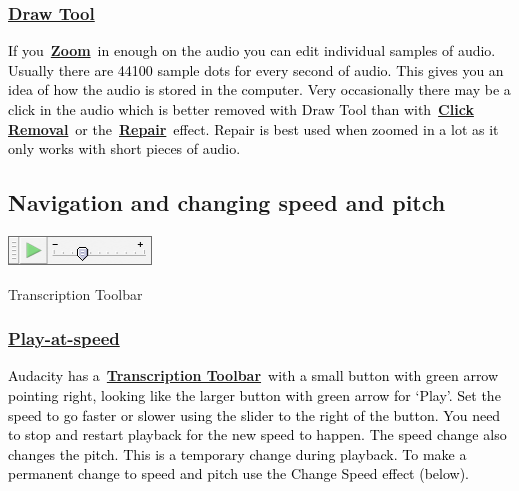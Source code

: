 \documentclass[letterpaper]{article}
\begin{document}
\subsubsection[Draw
Tool]{\href{https://manual.audacityteam.org/man/draw_tool.html}{\textcolor[rgb]{0.3529412,0.21176471,0.5882353}{Draw
Tool}}}
\textcolor{black}{If
you~}\href{https://manual.audacityteam.org/man/zooming.html}{\textbf{\textcolor[rgb]{0.3529412,0.21176471,0.5882353}{Zoom}}}\textcolor{black}{~in
enough on the audio you can edit individual samples of audio. Usually there are 44100 sample dots for every second of
audio. This gives you an idea of how the audio is stored in the computer. Very occasionally there may be a click in the
audio which is better removed with Draw Tool than
with~}\href{https://manual.audacityteam.org/man/click_removal.html}{\textbf{\textcolor[rgb]{0.3529412,0.21176471,0.5882353}{Click
Removal}}}\textcolor{black}{~or
the~}\href{https://manual.audacityteam.org/man/repair.html}{\textbf{\textcolor[rgb]{0.3529412,0.21176471,0.5882353}{Repair}}}\textcolor{black}{~effect.
Repair is best used when zoomed in a lot as it only works with short pieces of audio.}

\subsection[Navigation and changing speed and pitch]{\color{black} Navigation and changing speed and pitch}
\href{https://manual.audacityteam.org/man/toolbars_overview.html#upper_tooldock}{
\includegraphics[width=3.81cm,height=0.82cm]{TourGuide-img015.png} }

Transcription Toolbar

\subsubsection[Play{}-at{}-speed]{\href{https://manual.audacityteam.org/man/transcription_toolbar.html}{\textcolor[rgb]{0.3529412,0.21176471,0.5882353}{Play-at-speed}}}
\textcolor{black}{Audacity has
a~}\href{https://manual.audacityteam.org/man/transcription_toolbar.html}{\textbf{\textcolor[rgb]{0.3529412,0.21176471,0.5882353}{Transcription
Toolbar}}}\textcolor{black}{~with a small button with green arrow pointing right, looking like the larger button with
green arrow for `Play'. Set the speed to go faster or slower using the slider to the right of the button. You need to
stop and restart playback for the new speed to happen. The speed change also changes the pitch. This is a temporary
change during playback. To make a permanent change to speed and pitch use the Change Speed effect (below).}
\end{document}
